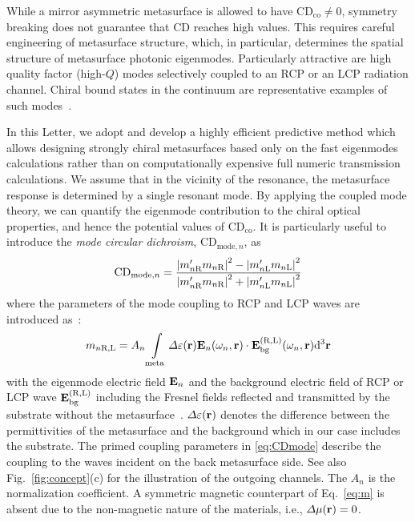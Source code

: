 \documentclass[
    reprint,
    superscriptaddress,
    a4paper,
    amsmath,amssymb,
    prl,
]{revtex4-2}
\begin{document}
While a mirror asymmetric metasurface is allowed to have $\mathrm{CD}_{\text{co}} \neq 0$, symmetry breaking does not guarantee that CD reaches high values. This requires careful engineering of metasurface structure, which, in particular, determines the spatial structure of metasurface photonic eigenmodes. 
Particularly attractive are high quality factor (high-$Q$) modes selectively coupled to an RCP or an LCP radiation channel. Chiral bound states in the continuum are representative examples of such modes~\cite{Gorkunov2020Aug,Overvig2021Feb,kuhner2023}.

In this Letter, we adopt and develop a highly efficient predictive method which allows designing strongly chiral metasurfaces based only on the fast eigenmodes calculations rather than on computationally expensive full numeric transmission calculations.
We assume that in the vicinity of the resonance, the metasurface response is determined by a single resonant mode. By applying the coupled mode theory, we can quantify the eigenmode contribution to the chiral optical properties, and hence the potential values of $\mathrm{CD}_{\text{co}}$. It is particularly useful to introduce the \textit{mode circular dichroism}, $\mathrm{CD}_{\text{mode},n}$, as~\cite{SM}
\begin{equation}
    \mathrm{CD}_{\text{mode},n} = \frac{\abs{m^{\prime}_{n \text{R}}m_{n\text{R}}}^2 - \abs{m^{\prime}_{n\text{L}}m_{n\text{L}}}^2}{\abs{m^{\prime}_{n\text{R}}m_{n\text{R}}}^2 + \abs{m^{\prime}_{n\text{L}}m_{n\text{L}}}^2}
    \label{eq:CDmode}
\end{equation}
where the parameters of the mode coupling to RCP and LCP waves are introduced as~\cite{Weiss2018PRB,Gorkunov2020Aug,koshelev2022PhDthesis,Koshelev2020Science}:
\begin{equation}
    m_{n\text{R,L}} = A_n \int \limits_{\text{meta}} \Delta \varepsilon (\vb{r}) \vb{E}_n (\omega_n, \vb{r}) \cdot \vb{E}_{\text{bg}}^{(\mathrm{R}, \mathrm{L})} (\omega_n, \vb{r}) \dd^{3} \vb{r}
    \label{eq:m}
\end{equation}
with the eigenmode electric field $\vb{E}_n$ and the background electric field of RCP or LCP wave $\vb{E}_{\text{bg}}^{(\mathrm{R},\mathrm{L})}$ including the Fresnel fields reflected and transmitted by the substrate without the metasurface~\cite[Sec.~VI]{Weiss2018PRB}. 
$\Delta \varepsilon (\vb{r})$ denotes the difference between the permittivities of the metasurface and the background which in our case includes the substrate.
The primed coupling parameters in \eqref{eq:CDmode} describe the coupling to the waves incident on the back metasurface side. See also Fig.~\ref{fig:concept}{(c)} for the illustration of the outgoing channels.
The $A_n$ is the normalization coefficient. A symmetric magnetic counterpart of Eq.~\eqref{eq:m} is absent due to the non-magnetic nature of the materials, i.e., $\Delta \mu (\vb{r}) =0$.
\end{document}
